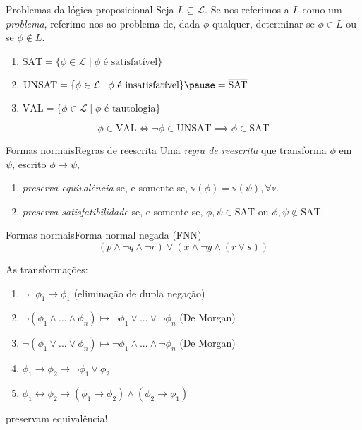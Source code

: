 \begin{frame}{Problemas da lógica proposicional}
	Seja $L \subseteq \mathcal{L}$. Se nos referimos a $L$ como um \emph{problema}, referimo-nos ao problema de, dada $\phi$ qualquer, determinar se $\phi \in L$ ou se $\phi \notin L$.
	\vspace{-.3cm}
	\begin{enumerate}
		\pause\item $\text{SAT} = \{\phi \in \mathcal{L} \mid \phi \text{ é satisfatível} \}$
		\pause\item $\text{UNSAT} = \{\phi \in \mathcal{L} \mid \phi \text{ é insatisfatível} \}\pause = \overline{\text{SAT}}$
		\pause\item $\text{VAL} = \{\phi \in \mathcal{L} \mid \phi \text{ é tautologia} \}$
	\end{enumerate}
	
	\vspace{.2cm}
	\pause $$\phi \in \text{VAL} \iff \neg \phi \in \text{UNSAT} \implies \phi \in \text{SAT}$$
\end{frame}

\begin{frame}{Formas normais}{Regras de reescrita}
	Uma \emph{regra de reescrita} que transforma $\phi$ em $\psi$, escrito $\phi \longmapsto \psi$,
	\begin{enumerate}
		\pause\item \emph{preserva equivalência} se, e somente se, $\mathbb{v}(\phi) = \mathbb{v}(\psi), \forall \mathbb{v}$.
		\pause\item \emph{preserva satisfatibilidade} se, e somente se, $\phi,\psi \in \text{SAT}$ ou $\phi,\psi \notin \text{SAT}$.
	\end{enumerate}
\end{frame}

\begin{frame}{Formas normais}{Forma normal negada (FNN)}
	$$(p \wedge \neg q \wedge \neg r) \vee (x \wedge \neg y \wedge (r \vee s))$$
	
	\pause As transformações:
	\begin{enumerate}
		\item $\neg \neg \phi_1 \longmapsto \phi_1$ \;\; (eliminação de dupla negação)
		\item $\neg(\phi_1 \wedge ... \wedge \phi_n) \longmapsto \neg \phi_1 \vee ... \vee \neg \phi_n$ \;\; (De Morgan)
		\item $\neg(\phi_1 \vee ... \vee \phi_n) \longmapsto \neg \phi_1 \wedge ... \wedge \neg \phi_n$ \;\; (De Morgan)
		\item $\phi_1 \rightarrow \phi_2 \longmapsto \neg \phi_1 \vee \phi_2$
		\item $\phi_1 \leftrightarrow \phi_2 \longmapsto (\phi_1 \rightarrow \phi_2) \wedge (\phi_2 \rightarrow \phi_1)$
	\end{enumerate}
	\pause preservam equivalência!
\end{frame}

